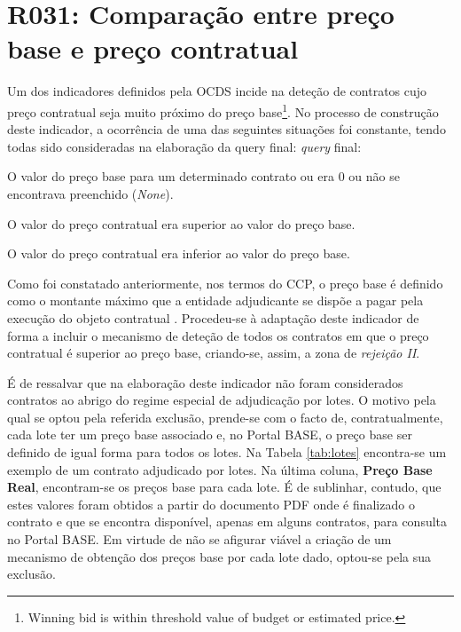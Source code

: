 \section{R031: Comparação entre preço base e preço contratual}

Um dos indicadores definidos pela OCDS incide na deteção de contratos cujo preço contratual seja muito próximo do preço base\footnote{Winning bid is within threshold value of budget or estimated price.}. No processo de construção deste indicador, a ocorrência de uma das seguintes situações foi constante, tendo todas sido consideradas na elaboração da query final:
 \textit{query} final:

\begin{my_enumerate}
	
	\item O valor do preço base para um determinado contrato ou era 0 ou não se encontrava preenchido (\textit{None}). \label{ponto1}
	
	\item O valor do preço contratual era superior ao valor do preço base. \label{ponto2}
	
	\item O valor do preço contratual era inferior ao valor do preço base.
	
\end{my_enumerate}

Como foi constatado anteriormente, nos termos do CCP, o preço base é definido como o montante máximo que a entidade adjudicante se dispõe a pagar pela execução do objeto contratual \cite{precobase}. Procedeu-se à adaptação deste indicador de forma a incluir o mecanismo de deteção de todos os contratos em que o preço contratual é superior ao preço base, criando-se, assim, a zona de \textit{rejeição II}.


É de ressalvar que na elaboração deste indicador não foram considerados contratos ao abrigo do regime especial de adjudicação por lotes. O motivo pela qual se optou pela referida exclusão, prende-se com o facto de, contratualmente, cada lote ter um preço base associado e, no Portal BASE, o preço base ser definido de igual forma para todos os lotes. Na Tabela \ref{tab:lotes} encontra-se um exemplo de um contrato adjudicado por lotes. Na última coluna, \textbf{Preço Base Real}, encontram-se os preços base para cada lote. É de sublinhar, contudo, que estes valores foram obtidos a partir do documento PDF onde é finalizado o contrato e que se encontra disponível, apenas em alguns contratos, para consulta no Portal BASE. Em virtude de não se afigurar viável a criação de um mecanismo de obtenção dos preços base por cada lote dado, optou-se pela sua exclusão.


